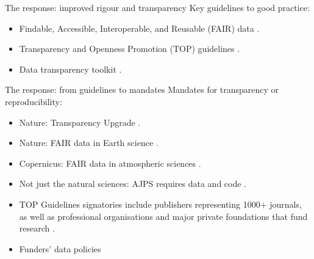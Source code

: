 \documentclass[aspectratio=169, 12pt]{beamer} %
\begin{document}
\begin{frame}{The response: improved rigour and transparency}
  Key guidelines to good practice:
    \begin{itemize}[label=\textbullet]
        \item Findable, Accessible, Interoperable, and Reusable (FAIR) data \cite{Wilkinson2016-mr, Go-fair2017-vs}.
        \item Transparency and Openness Promotion (TOP) guidelines \cite{Nosek2015-wm}.
        \item Data transparency toolkit \cite{Perkel2018-rw}.
    \end{itemize}
\end{frame}

\begin{frame}{The response: from guidelines to mandates}
  Mandates for transparency or reproducibility:
    \begin{itemize}[label=\textbullet]
        \item Nature: Transparency Upgrade \cite{Nature2017-lq}.
        \item Nature: FAIR data in Earth science \cite{Nature2019-ng}.
        \item Copernicus: FAIR data in atmospheric sciences \cite{Van_Edig2018-bu}.
        \item Not just the natural sciences: AJPS requires data and code \cite{Jacoby2017-lw, Ajps2015-ex}.
        \item TOP Guidelines signatories include publishers representing 1000+ journals, as well as professional organisations and major private foundations that fund research \cite{Cos2019-mr}.
        \item Funders' data policies \cite{Dcc2019-jn}
    \end{itemize}
\end{frame}


\end{document}
